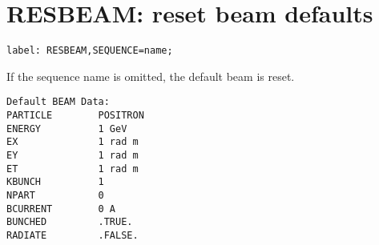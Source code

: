 
\section{RESBEAM: reset beam defaults}

\begin{verbatim}
label: RESBEAM,SEQUENCE=name;
\end{verbatim} 

If the sequence name is omitted, the default beam is reset. 
\begin{verbatim}
Default BEAM Data:
PARTICLE        POSITRON
ENERGY          1 GeV
EX              1 rad m
EY              1 rad m
ET              1 rad m
KBUNCH          1
NPART           0
BCURRENT        0 A
BUNCHED         .TRUE.
RADIATE         .FALSE.
\end{verbatim}


